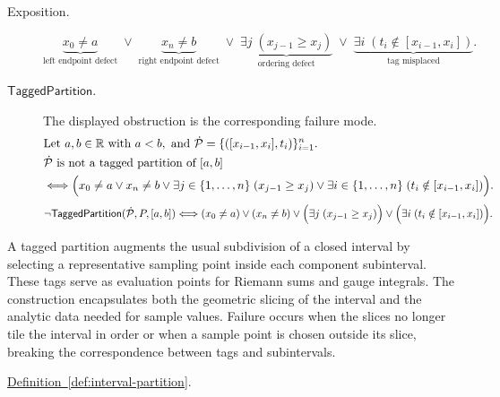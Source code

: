 \begin{remark*}
\begin{description}
  \item[Exposition.]
\[
\underbrace{x_0\ne a}_{\text{left endpoint defect}}
\;\lor\;
\underbrace{x_n\ne b}_{\text{right endpoint defect}}
\;\lor\;
\underbrace{\exists j\;(x_{j-1} \ge x_j)}_{\text{ordering defect}}
\;\lor\;
\underbrace{\exists i\;(t_i \notin [x_{i-1},x_i])}_{\text{tag misplaced}}.
\]


  \item[\(\mathsf{TaggedPartition}.\)]
  The displayed obstruction is the corresponding failure mode.
  \[
\begin{aligned}
&\text{Let } a,b \in \mathbb{R} \text{ with } a<b, \text{ and } \dot{\mathcal{P}}=\{([x_{i-1},x_i],t_i)\}_{i=1}^n.\\
&\dot{\mathcal{P}} \text{ is not a tagged partition of } [a,b]\\
&\Longleftrightarrow
\Bigl(x_0\ne a \lor x_n\ne b \lor
\exists j \in \{1,\ldots,n\}\;(x_{j-1} \ge x_j) \lor
\exists i \in \{1,\ldots,n\}\;(t_i \notin [x_{i-1},x_i])\Bigr).
\end{aligned}
  \]
  \[
\neg\mathsf{TaggedPartition}(\dot{\mathcal{P}},P,[a,b])
\Longleftrightarrow
(x_0\ne a)\lor(x_n\ne b)\lor
\Bigl(\exists j\;(x_{j-1} \ge x_j)\Bigr) \lor \Bigl(\exists i\;(t_i \notin [x_{i-1},x_i])\Bigr).
  \]
\end{description}
\end{remark*}

\begin{remark*}[Interpretation]
A tagged partition augments the usual subdivision of a closed interval by selecting a representative sampling point inside each component subinterval. These tags serve as evaluation points for Riemann sums and gauge integrals. The construction encapsulates both the geometric slicing of the interval and the analytic data needed for sample values. Failure occurs when the slices no longer tile the interval in order or when a sample point is chosen outside its slice, breaking the correspondence between tags and subintervals.
\end{remark*}

\begin{dependencies}
\hyperref[def:interval-partition]{Definition~\ref*{def:interval-partition}}.
\end{dependencies}


